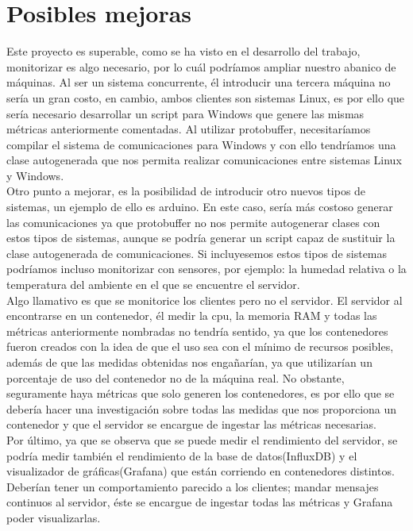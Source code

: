 \documentclass[ spanish, a4paper, 12pt, oneside]{report}
\begin{document}
\section{Posibles mejoras}

Este proyecto es superable, como se ha visto en el desarrollo del trabajo, monitorizar es algo necesario, por lo cuál podríamos ampliar nuestro abanico de máquinas. Al ser un sistema concurrente, él introducir una tercera máquina no sería un gran costo, en cambio, ambos clientes son sistemas Linux, es por ello que sería necesario desarrollar un script para Windows que 
genere las mismas métricas anteriormente comentadas. Al utilizar protobuffer, necesitaríamos compilar el sistema de comunicaciones para Windows y con ello tendríamos una clase autogenerada que nos permita realizar comunicaciones entre sistemas Linux y Windows.\\

Otro punto a mejorar, es la posibilidad de introducir otro nuevos tipos de sistemas, un ejemplo de ello es arduino. En este caso, sería más costoso generar las comunicaciones ya que protobuffer no nos permite autogenerar clases con estos tipos de sistemas, aunque se podría generar un script capaz de sustituir la clase autogenerada de comunicaciones. Si incluyesemos estos 
tipos de sistemas podríamos incluso monitorizar con sensores, por ejemplo: la humedad relativa o la temperatura del ambiente en el que se encuentre el servidor. \\

Algo llamativo es que se monitorice los clientes pero no el servidor. El servidor al encontrarse en un contenedor, él medir la cpu, la memoria RAM y todas las métricas anteriormente nombradas no tendría sentido, ya que los contenedores fueron creados con la idea de que el uso sea con el mínimo de recursos posibles, además de que las medidas obtenidas nos engañarían, ya que 
utilizarían un porcentaje de uso del contenedor no de la máquina real. No obstante, seguramente haya métricas que solo generen los contenedores, es por ello que se debería hacer una investigación sobre todas las medidas que nos proporciona un contenedor y que el servidor se encargue de ingestar las métricas necesarias.\\ 

Por último, ya que se observa que se puede medir el rendimiento del servidor, se podría medir también el rendimiento de la base de datos(InfluxDB) y el visualizador de gráficas(Grafana) que están corriendo en contenedores distintos. Deberían tener un comportamiento parecido a los clientes; mandar mensajes continuos al servidor, éste se encargue de ingestar todas las métricas 
y Grafana poder visualizarlas.\\
\end{document}
